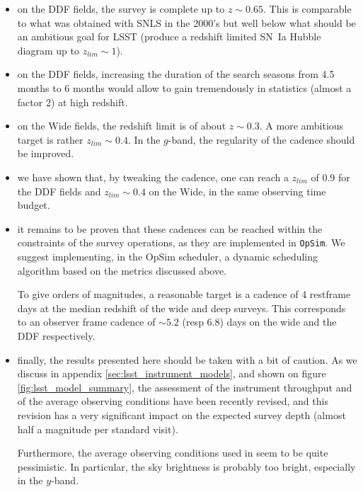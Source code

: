 \documentclass[\docopts]{\docclass}
\begin{document}
\begin{itemize}
\item on the DDF fields, the survey is complete up to $z \sim
  0.65$. This is comparable to what was obtained with SNLS in the
  2000's but well below what should be an ambitious goal for LSST
  (produce a redshift limited SN~Ia Hubble diagram up to $z_{lim} \sim
  1$).

\item on the DDF fields, increasing the duration of the search seasons
  from 4.5 months to 6 months would allow to gain tremendously in
  statistics (almost a factor 2) at high redshift.
  
\item on the Wide fields, the redshift limit is of about $z \sim
  0.3$. A more ambitious target is rather $z_{lim} \sim 0.4$.  In the
  $g$-band, the regularity of the cadence should be improved.

\item we have shown that, by tweaking the cadence, one can reach a
  $z_{lim}$ of 0.9 for the DDF fields and $z_{lim} \sim 0.4$ on the
  Wide, in the same observing time budget.

\item it remains to be proven that these cadences can be reached
  within the constraints of the survey operations, as they are
  implemented in {\tt OpSim}.  We suggest implementing, in the OpSim
  scheduler, a dynamic scheduling algorithm based on the metrics
  discussed above.  
  
  To give orders of magnitudes, a reasonable target is a cadence of 4
  restframe days at the median redshift of the wide and deep surveys.
  This corresponds to an observer frame cadence of $\sim 5.2$ (resp
  6.8) days on the wide and the DDF respectively.

\item finally, the results presented here should be taken with a bit
  of caution.  As we discuss in appendix
  \ref{sec:lsst_instrument_models}, and shown on figure
  \ref{fig:lsst_model_summary}, the assessment of the instrument
  throughput and of the average observing conditions have been
  recently revised, and this revision has a very significant impact on
  the expected survey depth (almost half a magnitude per standard
  visit).  

  Furthermore, the average observing conditions used in
   seem to be quite pessimistic.  In particular,
  the  sky brightness is probably too bright,
  especially in the $y$-band.
\end{itemize}
\end{document}
